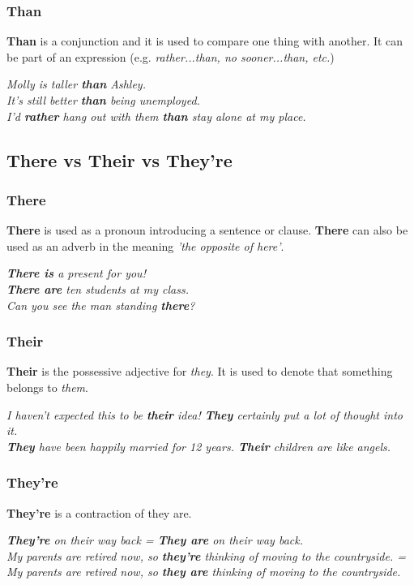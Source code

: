 \documentclass[hidelinks,10pt,a4paper]{article}
\begin{document}
\subsubsection{Than}
\textbf{Than} is a conjunction and it is used to compare one thing with another. It can be part of an expression (e.g. \textit{rather...than, no sooner...than, etc.})
\begin{center}
	\textit{Molly is taller \textbf{than} Ashley.}\\
	\textit{It's still better \textbf{than} being unemployed.}\\
	\textit{I'd \textbf{rather} hang out with them \textbf{than} stay alone at my place.}
\end{center}

\subsection{There vs Their vs They're}
\subsubsection{There}
\textbf{There} is used as a pronoun introducing a sentence or clause. \textbf{There} can also be used as an adverb in the meaning \textit{'the opposite of here'}.
\begin{center}
	\textit{\textbf{There is} a present for you!}\\
	\textit{\textbf{There are} ten students at my class.}\\
	\textit{Can you see the man standing \textbf{there}?}
\end{center}

\subsubsection{Their}
\textbf{Their} is the possessive adjective for \textit{they}. It is used to denote that something belongs to \textit{them}.
\begin{center}
	\textit{I haven't expected this to be \textbf{their} idea! \textbf{They} certainly put a lot of thought into it.}\\
	\textit{\textbf{They} have been happily married for 12 years. \textbf{Their} children are like angels.}
\end{center}

\subsubsection{They're}
\textbf{They're} is a contraction of they are.
\begin{center}
	\textit{\textbf{They're} on their way back = \textbf{They are} on their way back.}\\
	\textit{My parents are retired now, so \textbf{they're} thinking of moving to the countryside. = My parents are retired now, so \textbf{they are} thinking of moving to the countryside.}
\end{center}
\end{document}
